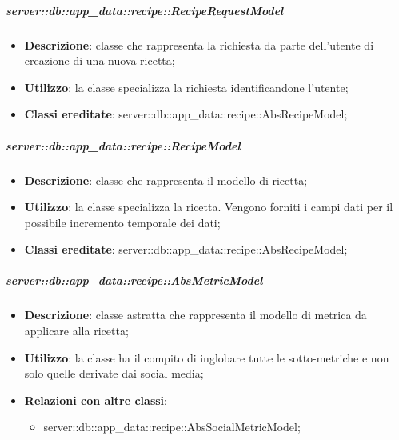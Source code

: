 		\subparagraph{server::db::app\_data::recipe::RecipeRequestModel} %
		\label{subp:server_db_app_data_recipe_reciperequestmodel}
			\begin{itemize}
				\item \textbf{Descrizione}: classe che rappresenta la richiesta da parte dell'utente di creazione di una nuova ricetta;
				\item \textbf{Utilizzo}: la classe specializza la richiesta identificandone l'utente;
				\item \textbf{Classi ereditate}: server::db::app\_data::recipe::AbsRecipeModel;
			\end{itemize}


		\subparagraph{server::db::app\_data::recipe::RecipeModel} %
		\label{subp:server_db_app_data_recipe_recipemodel}
			\begin{itemize}
				\item \textbf{Descrizione}: classe che rappresenta il modello di ricetta;
				\item \textbf{Utilizzo}: la classe specializza la ricetta. Vengono forniti i campi dati per il possibile incremento temporale dei dati;
				\item \textbf{Classi ereditate}: server::db::app\_data::recipe::AbsRecipeModel;
			\end{itemize}


		\subparagraph{server::db::app\_data::recipe::AbsMetricModel} %
		\label{subp:server_db_app_data_recipe_absmetricmodel}
			\begin{itemize}
				\item \textbf{Descrizione}: classe astratta che rappresenta il modello di metrica da applicare alla ricetta;
				\item \textbf{Utilizzo}: la classe ha il compito di inglobare tutte le sotto-metriche e non solo quelle derivate dai social media;
				\item \textbf{Relazioni con altre classi}:
					\begin{itemize}
						\item server::db::app\_data::recipe::AbsSocialMetricModel;
					\end{itemize}
			\end{itemize}


